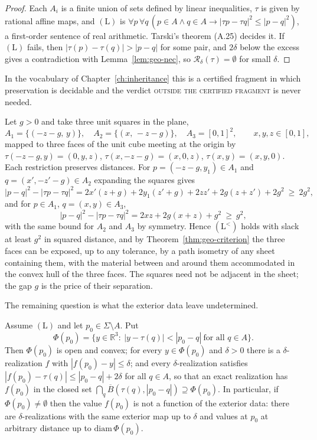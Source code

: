 \begin{proof}
Each $A_i$ is a finite union of sets defined by linear inequalities, $\tau$ is given by rational affine maps, and $(\mathrm L)$ is $\forall p\,\forall q\,(p\in A\wedge q\in A\to|\tau p-\tau q|^2\le|p-q|^2)$, a first-order sentence of real arithmetic. Tarski's theorem (A.25) decides it. If $(\mathrm L)$ fails, then $|\tau(p)-\tau(q)|>|p-q|$ for some pair, and $2\delta$ below the excess gives a contradiction with Lemma~\ref{lem:geo-nec}, so $\mathcal R_\delta(\tau)=\emptyset$ for small $\delta$.
\end{proof}

In the vocabulary of Chapter~\ref{ch:inheritance} this is a certified fragment in which preservation is decidable and the verdict \textsc{outside the certified fragment} is never needed.

\begin{example}
\label{ex:corner}
Let $g>0$ and take three unit squares in the plane,
\[
A_1=\{(-z-g,\,y)\},\quad A_2=\{(x,\,-z-g)\},\quad A_3=[0,1]^2,\qquad x,y,z\in[0,1],
\]
mapped to three faces of the unit cube meeting at the origin by $\tau(-z-g,y)=(0,y,z)$, $\tau(x,-z-g)=(x,0,z)$, $\tau(x,y)=(x,y,0)$. Each restriction preserves distances. For $p=(-z-g,y_1)\in A_1$ and $q=(x',-z'-g)\in A_2$ expanding the squares gives
\[
|p-q|^2-|\tau p-\tau q|^2=2x'(z+g)+2y_1(z'+g)+2zz'+2g(z+z')+2g^2\ \ge\ 2g^2,
\]
and for $p\in A_1$, $q=(x,y)\in A_3$,
\[
|p-q|^2-|\tau p-\tau q|^2=2xz+2g(x+z)+g^2\ \ge\ g^2,
\]
with the same bound for $A_2$ and $A_3$ by symmetry. Hence $(\mathrm L^{<})$ holds with slack at least $g^2$ in squared distance, and by Theorem~\ref{thm:geo-criterion} the three faces can be exposed, up to any tolerance, by a path isometry of any sheet containing them, with the material between and around them accommodated in the convex hull of the three faces. The squares need not be adjacent in the sheet; the gap $g$ is the price of their separation.
\end{example}

The remaining question is what the exterior data leave undetermined.

\begin{theorem}
\label{thm:geo-residue}
Assume $(\mathrm L)$ and let $p_0\in\Sigma\setminus A$. Put
\[
\Phi(p_0)=\{y\in\mathbb R^3:\ |y-\tau(q)|<|p_0-q|\ \text{for all } q\in A\}.
\]
Then $\Phi(p_0)$ is open and convex; for every $y\in\Phi(p_0)$ and $\delta>0$ there is a $\delta$-realization $f$ with $|f(p_0)-y|\le\delta$; and every $\delta$-realization satisfies $|f(p_0)-\tau(q)|\le|p_0-q|+2\delta$ for all $q\in A$, so that an exact realization has $f(p_0)$ in the closed set $\bigcap_{q}\overline B(\tau(q),|p_0-q|)\supseteq\Phi(p_0)$. In particular, if $\Phi(p_0)\neq\emptyset$ then the value $f(p_0)$ is not a function of the exterior data: there are $\delta$-realizations with the same exterior map up to $\delta$ and values at $p_0$ at arbitrary distance up to $\mathrm{diam}\,\Phi(p_0)$.
\end{theorem}

